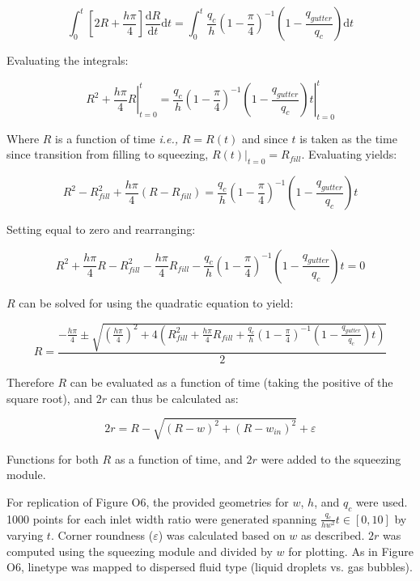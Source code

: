 $$
  \int_{0}^t{\left[2R + \frac{h\pi}{4}\right]
  \frac{\mathrm{d}R}{\mathrm{d}t}} \mathrm{d}t = 
  \int_{0}^t{\frac{q_c}{h} \left(1-\frac{\pi}{4}\right)^{-1}
  \left(1-\frac{q_{gutter}}{q_c}\right)} \mathrm{d}t
$$

\noindent Evaluating the integrals:

$$ 
  \left. R^2 + \frac{h\pi}{4}R \right|_{t=0}^{t}=
  \left. \frac{q_c}{h}
  \left(1-\frac{\pi}{4}\right)^{-1}
  \left(1-\frac{q_{gutter}}{q_c}\right)t \right|_{t=0}^{t}
$$

\noindent Where $R$ is a function of time \emph{i.e.,} $R=R\left(t\right)$ and since
$t$ is taken as the time since transition from filling to squeezing,
$\left. R\left(t\right)\right|_{t=0} = R_{fill}$. Evaluating yields:

$$
  R^2 - R_{fill}^2 + \frac{h\pi}{4}\left(R-R_{fill}\right) = 
  \frac{q_c}{h}
  \left(1-\frac{\pi}{4}\right)^{-1}
  \left(1-\frac{q_{gutter}}{q_c}\right)t
$$

\noindent Setting equal to zero and rearranging:

$$
  R^2 + \frac{h\pi}{4}R -
  R_{fill}^2 - \frac{h\pi}{4}R_{fill} -
  \frac{q_c}{h}
  \left(1-\frac{\pi}{4}\right)^{-1}
  \left(1-\frac{q_{gutter}}{q_c}\right)t = 0
$$

\noindent $R$ can be solved for using the quadratic equation to yield:

\begin{equation}
  R = \frac{-\frac{h\pi}{4} \pm 
  \sqrt{\left(\frac{h\pi}{4}\right)^2 +
  4\left(R_{fill}^2 + \frac{h\pi}{4}R_{fill} +
  \frac{q_c}{h}
  \left(1-\frac{\pi}{4}\right)^{-1}
  \left(1-\frac{q_{gutter}}{q_c}\right)t\right)}}{2}
\end{equation}

\noindent Therefore $R$ can be evaluated as a function of time (taking the positive of the square root), and
$2r$ can thus be calculated as:

\begin{equation}
  2r = R - \sqrt{\left(R - w\right)^2 + \left(R - w_{in}\right)^2} + \varepsilon
\end{equation}

\noindent Functions for both $R$ as a function of time, and $2r$ were added
to the squeezing module.

For replication of Figure O6, the provided geometries for $w$, $h$, and $q_c$ were used. 1000
points for each inlet width ratio were generated spanning $\frac{q_c}{hw^2}t \in [0,10]$ by varying 
$t$. Corner roundness ($\varepsilon$) was calculated based on $w$ as described. $2r$ was
computed using the squeezing module and divided by $w$ for plotting. As in Figure O6, linetype
was mapped to dispersed fluid type (liquid droplets vs. gas bubbles).

